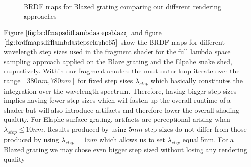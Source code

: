 \begin{figure}[H]
  \centering
~
~
~
    
\caption[BRDF Map using our Approaches for Blazed Grating]{BRDF maps for Blazed grating comparing our different rendering approaches}
\label{fig:brdfmapsdiffrenderingapproaches}
\end{figure}

Figure $\ref{fig:brdfmapsdifflambdastepsblaze}$ and figure $\ref{fig:brdfmapsdifflambdastepselaphe65}$ show the BRDF maps for different wavelength step sizes used in the fragment shader for the full lambda space sampling approach applied on the Blaze grating and the Elpahe snake shed, respectively. Within our fragment shaders the most outer loop iterate over the range $[380nm, 780nm]$ for fixed step sizes $\lambda_{step}$ which basically constitutes the integration over the wavelength spectrum. Therefore, having bigger step sizes implies having fewer step sizes which will fasten up the overall runtime of a shader but will also introduce artifacts and therefore lower the overall shading qualtity. For Elaphe surface grating, artifacts are perceptional arising when $\lambda_{step} \leq 10nm$. Results produced by using $5nm$ step sizes do not differ from those produced by using $\lambda_{step}= 1nm$ which allows us to set $\lambda_{step}$ equal 5nm. For a Blazed grating we may chose even bigger step sized without losing any rendering quality.   


